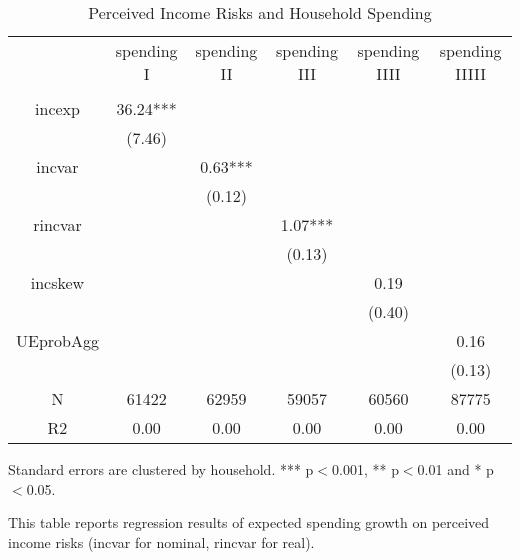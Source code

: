 \begin{table}[p]
\centering
\begin{adjustbox}{width={0.9\textwidth}}
\begin{threeparttable}
\caption{Perceived Income Risks and Household Spending}
\label{spending_reg}\begin{tabular}{cccccc}
\toprule
{} & spending I & spending II & spending III & spending IIII & spending IIIII \\
          &            &             &              &               &                \\
\midrule
incexp    &   36.24*** &             &              &               &                \\
          &     (7.46) &             &              &               &                \\
incvar    &            &     0.63*** &              &               &                \\
          &            &      (0.12) &              &               &                \\
rincvar   &            &             &      1.07*** &               &                \\
          &            &             &       (0.13) &               &                \\
incskew   &            &             &              &          0.19 &                \\
          &            &             &              &        (0.40) &                \\
UEprobAgg &            &             &              &               &           0.16 \\
          &            &             &              &               &         (0.13) \\
N         &      61422 &       62959 &        59057 &         60560 &          87775 \\
R2        &       0.00 &        0.00 &         0.00 &          0.00 &           0.00 \\
\bottomrule
\end{tabular}
\begin{tablenotes}\item Standard errors are clustered by household. *** p$<$0.001, ** p$<$0.01 and * p$<$0.05. 
\item This table reports regression results of expected spending growth on perceived income risks (incvar for nominal, rincvar for real).
\end{tablenotes}
\end{threeparttable}
\end{adjustbox}
\end{table}